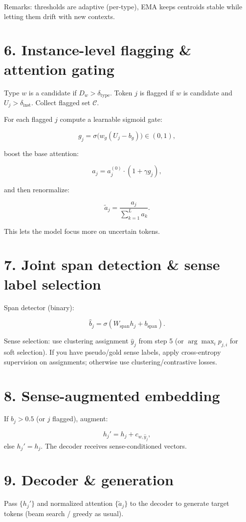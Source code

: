 \documentclass[a4paper,12pt]{article}
\begin{document}
Remarks: thresholds are adaptive (per-type), EMA keeps centroids stable while letting them drift with new contexts.

\section*{6. Instance-level flagging \& attention gating}
Type $w$ is a candidate if $D_w > \delta_{\text{type}}$. Token $j$ is flagged if $w$ is candidate and $U_j > \delta_{\text{inst}}$. Collect flagged set $\mathcal{C}$.

For each flagged $j$ compute a learnable sigmoid gate:

\[
g_j = \sigma\big(w_g (U_j - b_g)\big) \in (0,1),
\]

boost the base attention:

\[
a_j = a_j^{(0)} \cdot (1 + \gamma g_j),
\]

and then renormalize:

\[
\tilde{a}_j = \frac{a_j}{\sum_{k=1}^L a_k}.
\]

This lets the model focus more on uncertain tokens.

\section*{7. Joint span detection \& sense label selection}
Span detector (binary):

\[
\hat{b}_j = \sigma(W_{\text{span}} h_j + b_{\text{span}}).
\]

Sense selection: use clustering assignment $\hat{y}_j$ from step 5 (or $\arg\max_i p_{j,i}$ for soft selection). If you have pseudo/gold sense labels, apply cross-entropy supervision on assignments; otherwise use clustering/contrastive losses.

\section*{8. Sense-augmented embedding}
If $\hat{b}_j > 0.5$ (or $j$ flagged), augment:

\[
h_j' = h_j + c_{w,\hat{y}_j},
\]
else $h_j' = h_j$. The decoder receives sense-conditioned vectors.

\section*{9. Decoder \& generation}
Pass $\{h_j'\}$ and normalized attention $\{\tilde{a}_j\}$ to the decoder to generate target tokens (beam search / greedy as usual).
\end{document}
